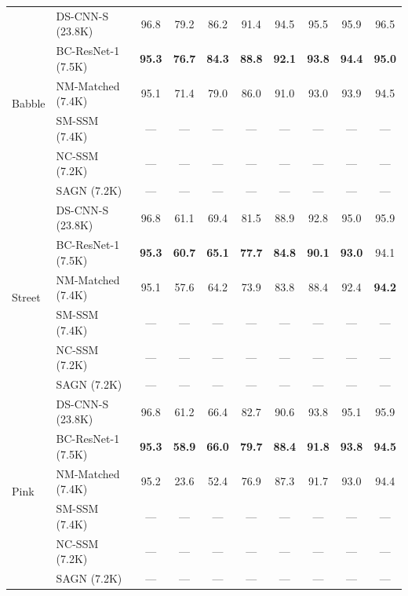 \documentclass[journal]{IEEEtran}
\begin{document}
\begin{table}[t]
\begin{tabular}{ll|cccccccc}
\midrule
\multirow{6}{*}{Babble}
  & DS-CNN-S (23.8K)    & 96.8 & 79.2 & 86.2 & 91.4 & 94.5 & 95.5 & 95.9 & 96.5 \\
  & BC-ResNet-1 (7.5K)  & \textbf{95.3} & \textbf{76.7} & \textbf{84.3} & \textbf{88.8} & \textbf{92.1} & \textbf{93.8} & \textbf{94.4} & \textbf{95.0} \\
  & NM-Matched (7.4K)   & 95.1 & 71.4 & 79.0 & 86.0 & 91.0 & 93.0 & 93.9 & 94.5 \\
  & SM-SSM (7.4K)       & --- & --- & --- & --- & --- & --- & --- & --- \\
  & NC-SSM (7.2K)       & --- & --- & --- & --- & --- & --- & --- & --- \\
  & SAGN (7.2K)         & --- & --- & --- & --- & --- & --- & --- & --- \\
\midrule
\multirow{6}{*}{Street}
  & DS-CNN-S (23.8K)    & 96.8 & 61.1 & 69.4 & 81.5 & 88.9 & 92.8 & 95.0 & 95.9 \\
  & BC-ResNet-1 (7.5K)  & \textbf{95.3} & \textbf{60.7} & \textbf{65.1} & \textbf{77.7} & \textbf{84.8} & \textbf{90.1} & \textbf{93.0} & 94.1 \\
  & NM-Matched (7.4K)   & 95.1 & 57.6 & 64.2 & 73.9 & 83.8 & 88.4 & 92.4 & \textbf{94.2} \\
  & SM-SSM (7.4K)       & --- & --- & --- & --- & --- & --- & --- & --- \\
  & NC-SSM (7.2K)       & --- & --- & --- & --- & --- & --- & --- & --- \\
  & SAGN (7.2K)         & --- & --- & --- & --- & --- & --- & --- & --- \\
\midrule
\multirow{6}{*}{Pink}
  & DS-CNN-S (23.8K)    & 96.8 & 61.2 & 66.4 & 82.7 & 90.6 & 93.8 & 95.1 & 95.9 \\
  & BC-ResNet-1 (7.5K)  & \textbf{95.3} & \textbf{58.9} & \textbf{66.0} & \textbf{79.7} & \textbf{88.4} & \textbf{91.8} & \textbf{93.8} & \textbf{94.5} \\
  & NM-Matched (7.4K)   & 95.2 & 23.6 & 52.4 & 76.9 & 87.3 & 91.7 & 93.0 & 94.4 \\
  & SM-SSM (7.4K)       & --- & --- & --- & --- & --- & --- & --- & --- \\
  & NC-SSM (7.2K)       & --- & --- & --- & --- & --- & --- & --- & --- \\
  & SAGN (7.2K)         & --- & --- & --- & --- & --- & --- & --- & --- \\
\bottomrule
\end{tabular}
\end{table}
\end{document}
